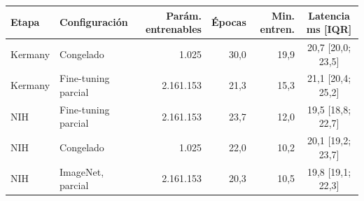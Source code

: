 \begin{tabular}{llrrrc}
\toprule
Etapa & Configuración & Parám. entrenables & Épocas & Min. entren. & Latencia ms [IQR] \\
\midrule
Kermany & Congelado & 1.025 & 30{,}0 & 19{,}9 & 20{,}7 [20{,}0; 23{,}5] \\
Kermany & Fine-tuning parcial & 2.161.153 & 21{,}3 & 15{,}3 & 21{,}1 [20{,}4; 25{,}2] \\
NIH & Fine-tuning parcial & 2.161.153 & 23{,}7 & 12{,}0 & 19{,}5 [18{,}8; 22{,}7] \\
NIH & Congelado & 1.025 & 22{,}0 & 10{,}2 & 20{,}1 [19{,}2; 23{,}7] \\
NIH & ImageNet, parcial & 2.161.153 & 20{,}3 & 10{,}5 & 19{,}8 [19{,}1; 22{,}3] \\
\bottomrule
\end{tabular}

